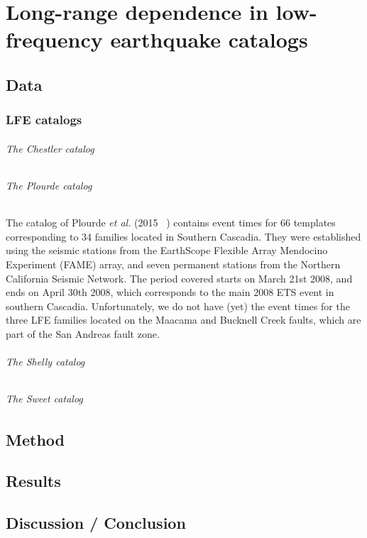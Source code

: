 \documentclass[main.tex]{subfiles}
\begin{document}
\part{Long-range dependence in low-frequency earthquake catalogs}

\chapter{Data}

\section{LFE catalogs}

\paragraph{The Chestler catalog}

\paragraph{The Plourde catalog} The catalog of Plourde \textit{et al.} (2015 ~\cite{PLO_2015}) contains event times for 66 templates corresponding to 34 families located in Southern Cascadia. They were established using the seismic stations from the EarthScope Flexible Array Mendocino Experiment (FAME) array, and seven permanent stations from the Northern California Seismic Network. The period covered starts on March 21st 2008, and ends on April 30th 2008, which corresponds to the main 2008 ETS event in southern Cascadia. Unfortunately, we do not have (yet) the event times for the three LFE families located on the Maacama and Bucknell Creek faults, which are part of the San Andreas fault zone.

\paragraph{The Shelly catalog}

\paragraph{The Sweet catalog}

\chapter{Method}

\chapter{Results}

\chapter{Discussion / Conclusion}
\end{document}

